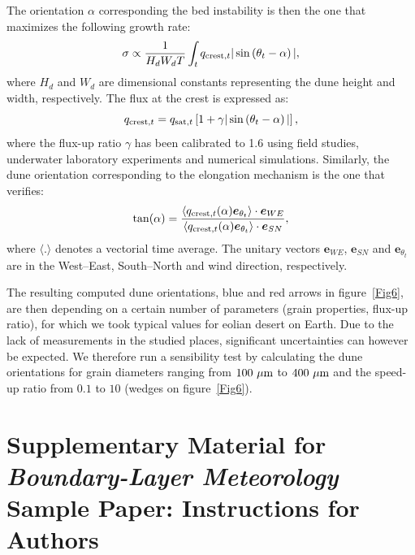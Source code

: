 The orientation $\alpha$ corresponding the bed instability is then the one that maximizes the following growth rate:
\begin{equation}
  \sigma \propto \frac{1}{H_{d} W_{d} T}\int_{t}  q_{\textup{crest}, t}\vert \sin\left(\theta_{t} - \alpha\right) \vert,
\end{equation}
where $H_{d}$ and $W_{d}$ are dimensional constants representing the dune height and width, respectively. The flux at the crest is expressed as:
\begin{equation}
  q_{\textup{crest}, t} = q_{\textup{sat}, t}\left[1 + \gamma\vert\sin\left(\theta_{t} - \alpha\right)\vert\right],
\end{equation}
where the flux-up ratio $\gamma$ has been calibrated to 1.6 using field studies, underwater laboratory experiments and numerical simulations. Similarly, the dune orientation corresponding to the elongation mechanism is the one that verifies:
\begin{equation}
  \tan(\alpha) = \frac{\langle q_{\textup{crest}, t}(\alpha) \boldsymbol{e}_{\theta_{t}}\rangle \cdot \boldsymbol{e}_{WE} }{ \langle q_{\textup{crest}, t}(\alpha) \boldsymbol{e}_{\theta_{t}} \rangle \cdot \boldsymbol{e}_{SN}},
\end{equation}
where $\langle.\rangle$ denotes a vectorial time average. The unitary vectors $\boldsymbol{e}_{WE}$, $\boldsymbol{e}_{SN}$ and $\boldsymbol{e}_{\theta_{t}}$ are in the West--East, South--North and wind direction, respectively.

The resulting computed dune orientations, blue and red arrows in figure~\ref{Fig6}, are then depending on a certain number of parameters (grain properties, flux-up ratio), for which we took typical values for eolian desert on Earth. Due to the lack of measurements in the studied places, significant uncertainties can however be expected. We therefore run a sensibility test by calculating the dune orientations for grain diameters ranging from $100~\mu\textup{m}$ to $400~\mu\textup{m}$ and the speed-up ratio from $0.1$ to $10$ (wedges on figure~\ref{Fig6}).

\clearpage




\newpage
\renewcommand{\thefigure}{S\arabic{figure}}
\setcounter{figure}{0}

\section*{Supplementary Material for \textit{Boundary-Layer Meteorology} Sample Paper: Instructions for Authors}

